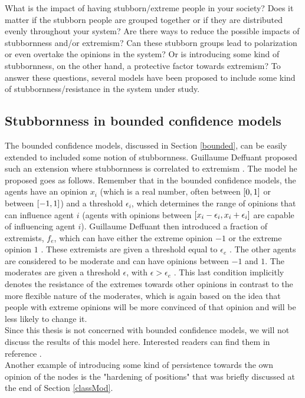 \documentclass[11 pt , letterpaper , twoside , openright]{book}
\begin{document}
\newline
What is the impact of having stubborn/extreme people in your society? Does it matter if the stubborn people are grouped together or if they are distributed evenly throughout your system? Are there ways to reduce the possible impacts of stubbornness and/or extremism? Can these stubborn groups lead to polarization or even overtake the opinions in the system? Or is introducing some kind of stubbornness, on the other hand, a protective factor towards extremism? To answer these questions, several models have been proposed to include some kind of stubbornness/resistance in the system under study.

\subsection{Stubbornness in bounded confidence models}

The bounded confidence models, discussed in Section \ref{bounded}, can be easily extended to included some notion of stubbornness. Guillaume Deffuant proposed such an extension where stubbornness is correlated to extremism \cite{Deffuant2006}. The model he proposed goes as follows. Remember that in the bounded confidence models, the agents have an opinion $x_i$ (which is a real number, often between $\interval{0}{1}$ or between $\interval{-1}{1}$) and a threshold $\epsilon_i$, which determines the range of opinions that can influence agent $i$ (agents with opinions between $\interval{x_i - \epsilon_i}{x_i + \epsilon_i}$ are capable of influencing agent $i$). Guillaume Deffuant then introduced a fraction of extremists, $f_e$, which can have either the extreme opinion $-1$ or the extreme opinion $1$ \cite{Deffuant2006}. These extremists are given a threshold equal to $\epsilon_e$ \cite{Deffuant2006}. The other agents are considered to be moderate and can have opinions between $-1$ and $1$. The moderates are given a threshold $\epsilon$, with $\epsilon > \epsilon_e$ \cite{Deffuant2006}. This last condition implicitly denotes the resistance of the extremes towards other opinions in contrast to the more flexible nature of the moderates, which is again based on the idea that people with extreme opinions will be more convinced of that opinion and will be less likely to change it.\\
Since this thesis is not concerned with bounded confidence models, we will not discuss the results of this model here. Interested readers can find them in reference \cite{Deffuant2006}. \\
\newline
Another example of introducing some kind of persistence towards the own opinion of the nodes is the "hardening of positions" that was briefly discussed at the end of Section \ref{classMod}.
\end{document}
